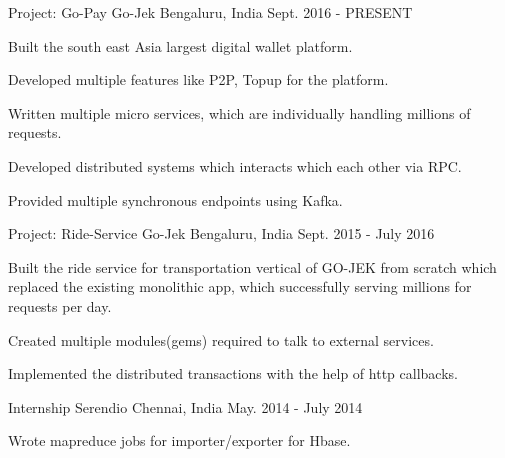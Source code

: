

\begin{cventries}

  \cventry
    {Project: Go-Pay} %
    {Go-Jek} %
    {Bengaluru, India} %
    {Sept. 2016 - PRESENT} %
    {
      \begin{cvitems} %
        \item {Built the south east Asia largest digital wallet platform.}
        \item {Developed multiple features like P2P, Topup for the platform.}
        \item {Written multiple micro services, which are individually handling millions of requests.}
        \item {Developed distributed systems which interacts which each other via RPC.}
        \item {Provided multiple synchronous endpoints using Kafka.}
      \end{cvitems}
    }
  \cventry
  {Project: Ride-Service} %
  {Go-Jek} %
  {Bengaluru, India} %
  {Sept. 2015 - July 2016} %
    {
      \begin{cvitems} %
        \item {Built the ride service for transportation vertical of GO-JEK from scratch which replaced the existing monolithic app, which successfully serving millions for requests per day.}
        \item {Created multiple modules(gems) required to talk to external services.}
        \item {Implemented the distributed transactions with the help of http callbacks.}
      \end{cvitems}
    }
\cventry
{Internship} %
{Serendio} %
{Chennai, India} %
{May. 2014 - July 2014} %
  {
    \begin{cvitems} %
      \item {Wrote mapreduce jobs for importer/exporter for Hbase.}
    \end{cvitems}
  }
\end{cventries}
